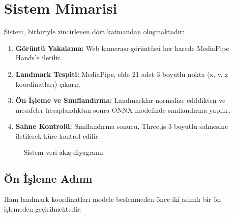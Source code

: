 \documentclass[12pt,a4paper]{article}
\begin{document}
\section{Sistem Mimarisi}

Sistem, birbiriyle zincirlenen dört katmandan oluşmaktadır:

\begin{enumerate}
    \item \textbf{Görüntü Yakalama:} Web kamerası görüntüsü her karede MediaPipe Hands'e iletilir.
    \item \textbf{Landmark Tespiti:} MediaPipe, elde 21 adet 3 boyutlu nokta (x, y, z koordinatları) çıkarır.
    \item \textbf{Ön İşleme ve Sınıflandırma:} Landmarklar normalize edildikten ve mesafeler hesaplandıktan sonra ONNX modelinde sınıflandırma yapılır.
    \item \textbf{Sahne Kontrolü:} Sınıflandırma sonucu, Three.js 3 boyutlu sahnesine iletilerek küre kontrol edilir.
\end{enumerate}

\begin{figure}[H]
\centering
{}
\caption{Sistem veri akış diyagramı}
\end{figure}

\subsection{Ön İşleme Adımı}

Ham landmark koordinatları modele beslenmeden önce iki adımlı bir ön işlemeden geçirilmektedir:
\end{document}
